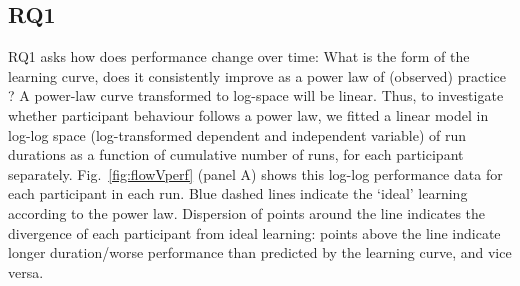 \documentclass[fleqn,10pt]{wlscirep}
\begin{document}
\subsection*{RQ1}
{\sf RQ1} asks how does performance change over time: What is the form of the learning curve, does it consistently improve as a power law of (observed) practice \cite{Newell1982}? A power-law curve transformed to log-space will be linear. Thus, to investigate whether participant behaviour follows a power law, we fitted a linear model in log-log space (log-transformed dependent and independent variable) of run durations as a function of cumulative number of runs, for each participant separately. Fig.~\ref{fig:flowVperf} (panel A) shows this log-log performance data for each participant in each run. Blue dashed lines indicate the `ideal' learning according to the power law. Dispersion of points around the line indicates the divergence of each participant from ideal learning: points above the line indicate longer duration/worse performance than predicted by the learning curve, and vice versa.

\end{document}

